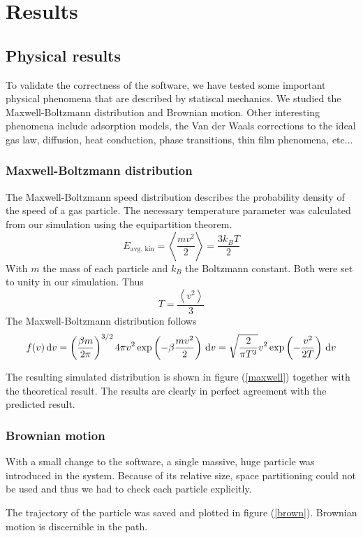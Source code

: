 \section{Results}
\subsection{Physical results}

To validate the correctness of the software, we have tested some important 
physical phenomena that are described by statiscal mechanics. We studied the 
Maxwell-Boltzmann distribution and Brownian motion. Other interesting phenomena 
include adsorption models, the Van der Waals corrections to the ideal gas law, 
diffusion, heat conduction, phase transitions, thin film phenomena, etc...

\subsubsection{Maxwell-Boltzmann distribution}
The Maxwell-Boltzmann speed distribution describes the probability density of 
the speed of a gas particle. The necessary temperature parameter was calculated 
from our simulation using the equipartition theorem.
$$
E_{\textrm{avg, kin}} = \left< \frac{mv^2}{2} \right> = \frac{3k_BT}{2}
$$
With $m$ the mass of each particle and $k_B$ the Boltzmann constant. Both were 
set to unity in our simulation. Thus
$$
T = \frac{\left< v^2 \right>}{3}
$$
The Maxwell-Boltzmann distribution follows
$$
f(v)\,\mathrm d v = \left( \frac{\beta m}{2 \pi} \right)^{3/2} 4 \pi v^2
\exp\left( -\beta \frac{mv^2}{2}\right) \,\mathrm d v =
\sqrt{ \frac{2}{\pi T^3} } v^2 \exp \left(-\frac{v^2}{2T}\right) \,\mathrm d v
$$

The resulting simulated distribution is shown in figure (\ref{maxwell}) 
together with the theoretical result. The results are clearly in perfect 
agreement with the predicted result.

\subsubsection{Brownian motion}
With a small change to the software, a single massive, huge particle was 
introduced in the system. Because of its relative size, space partitioning 
could not be used and thus we had to check each particle explicitly. 


The trajectory of the particle was saved and plotted in figure (\ref{brown}).  
Brownian motion is discernible in the path.


